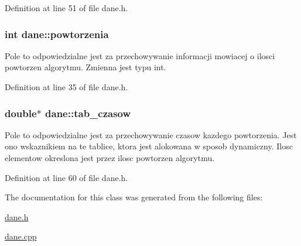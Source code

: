 Definition at line 51 of file dane.\-h.

\hypertarget{classdane_a77efb8d7494e984418802f6e7cc32d20}{
\subsubsection[{powtorzenia}]{\setlength{\rightskip}{0pt plus 5cm}int dane\-::powtorzenia}}\label{classdane_a77efb8d7494e984418802f6e7cc32d20}
Pole to odpowiedzialne jest za przechowywanie informacji mowiacej o ilosci powtorzen algorytmu. Zmienna jest typu int. 

Definition at line 35 of file dane.\-h.

\hypertarget{classdane_a722f3af9d9a100995ebaba0fc63e6e25}{
\subsubsection[{tab\-\_\-czasow}]{\setlength{\rightskip}{0pt plus 5cm}double$\ast$ dane\-::tab\-\_\-czasow}}\label{classdane_a722f3af9d9a100995ebaba0fc63e6e25}
Pole to odpowiedzialne jest za przechowywanie czasow kazdego powtorzenia. Jest ono wskaznikiem na te tablice, ktora jest alokowana w sposob dynamiczny. Ilosc elementow okreslona jest przez ilosc powtorzen algorytmu. 

Definition at line 60 of file dane.\-h.



The documentation for this class was generated from the following files\-:\begin{DoxyCompactItemize}
\item 
\hyperlink{dane_8h}{dane.\-h}\item 
\hyperlink{dane_8cpp}{dane.\-cpp}\end{DoxyCompactItemize}
